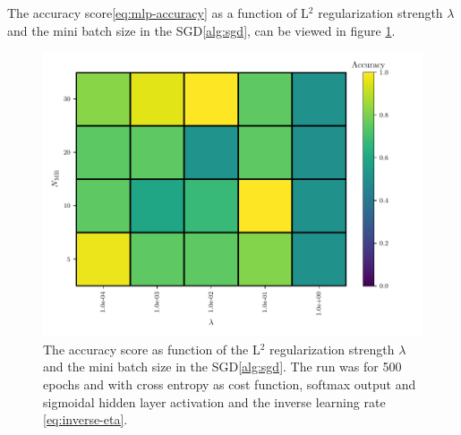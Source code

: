 The accuracy score\eqref{eq:mlp-accuracy} as a function of L$^2$ regularization strength $\lambda$ and the mini batch size in the SGD\ref{alg:sgd}, can be viewed in figure \ref{fig:mlp-lambda-mb}.
\begin{figure}[H]
    \centering
    \includegraphics[scale=1.0]{../fig/mlp_lambda_mini_batch_size.pdf}
    \caption{The accuracy score as function of the  L$^2$ regularization strength $\lambda$ and the mini batch size in the SGD\ref{alg:sgd}. The run was for 500 epochs and with cross entropy as cost function, softmax output and sigmoidal hidden layer activation and the inverse learning rate \eqref{eq:inverse-eta}.}
    \label{fig:mlp-lambda-mb}
\end{figure}
